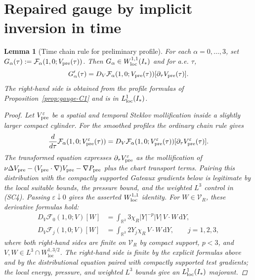\documentclass[11pt]{amsart}
\theoremstyle{plain}
\newtheorem{lemma}[theorem]{Lemma}
\theoremstyle{definition}
\theoremstyle{remark}
\newcommand{\dd}{\mathrm d}
\begin{document}
\section{Repaired gauge by implicit inversion in time}\label{sec:gauge-solve}
\begin{lemma}[Time chain rule for preliminary profile]\label{lem:diff-F-pre}
For each
\(\alpha=0,\dots,3\), set \(G_\alpha(\tau):=\mathcal F_\alpha(1,0;V_{\rm pre}(\tau))\).
Then \(G_\alpha\in W^{1,1}_{\rm loc}(I_*)\) and for a.e. \(\tau\),
\[
G_\alpha'(\tau)=D_V\mathcal F_\alpha(1,0;V_{\rm pre}(\tau))[\partial_\tau V_{\rm pre}(\tau)].
\]
The right-hand side is obtained from the profile formulas of
Proposition~\ref{prop:gauge-C1} and is in \(L^1_{\rm loc}(I_*)\).
\begin{proof}
Let \(V_{\rm pre}^\varepsilon\) be a spatial and temporal Steklov mollification
inside a slightly larger compact cylinder.  For the smoothed profiles the
ordinary chain rule gives
\[
\frac d{d\tau}\mathcal F_\alpha(1,0;V_{\rm pre}^\varepsilon(\tau))
=D_V\mathcal F_\alpha(1,0;V_{\rm pre}^\varepsilon(\tau))
[\partial_\tau V_{\rm pre}^\varepsilon(\tau)] .
\]
The transformed equation expresses \(\partial_\tau V_{\rm pre}^\varepsilon\)
as the mollification of
\(\nu\Delta V_{\rm pre}-(V_{\rm pre}\cdot\nabla)V_{\rm pre}-\nabla P_{\rm pre}\)
plus the chart transport terms.  Pairing this distribution with the compactly
supported Gateaux gradients below is legitimate by the local suitable bounds,
the pressure bound, and the weighted \(L^3\) control in \textup{(SC4)}.  Passing
\(\varepsilon\downarrow0\) gives the asserted \(W^{1,1}_{\rm loc}\) identity.
For \(W\in\mathcal V_R\), these derivative formulas hold:
\[
\begin{aligned}
D_V\mathcal F_0(1,0;V)[W]&=\int_{\mathbb R^3}3\chi_R|Y|^{-p}|V|\,V\cdot W\,\dd Y,\\
D_V\mathcal F_j(1,0;V)[W]&=\int_{\mathbb R^3}2Y_j\chi_R\,V\cdot W\,\dd Y,\qquad j=1,2,3,
\end{aligned}
\]
where both right-hand sides are finite on \(\mathcal V_R\) by compact support, \(p<3\), and
\(V,W\in L^3\cap W^{1,3/2}_{\mathrm{loc}}\).
The right-hand side is finite by the explicit formulas above and by the distributional
equation paired with compactly supported test gradients; the local energy,
pressure, and weighted \(L^3\) bounds give an \(L^1_{\rm loc}(I_*)\) majorant.
\end{proof}
\end{lemma}
\end{document}
